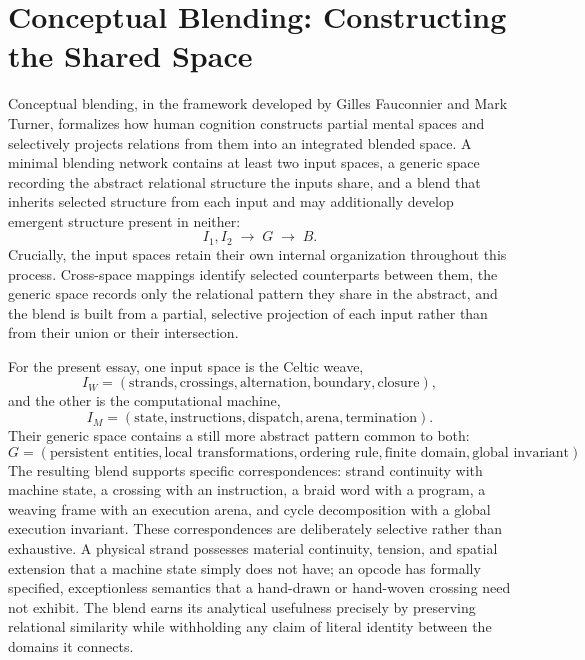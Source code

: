 \documentclass[11pt,openany]{book}
\begin{document}
\section{Conceptual Blending: Constructing the Shared Space}

Conceptual blending, in the framework developed by Gilles Fauconnier and Mark Turner, formalizes how human cognition constructs partial mental spaces and selectively projects relations from them into an integrated blended space. A minimal blending network contains at least two input spaces, a generic space recording the abstract relational structure the inputs share, and a blend that inherits selected structure from each input and may additionally develop emergent structure present in neither:
\[
I_1, I_2 \;\longrightarrow\; G \;\longrightarrow\; B.
\]
Crucially, the input spaces retain their own internal organization throughout this process. Cross-space mappings identify selected counterparts between them, the generic space records only the relational pattern they share in the abstract, and the blend is built from a partial, selective projection of each input rather than from their union or their intersection.

For the present essay, one input space is the Celtic weave,
\[
I_W = (\text{strands}, \text{crossings}, \text{alternation}, \text{boundary}, \text{closure}),
\]
and the other is the computational machine,
\[
I_M = (\text{state}, \text{instructions}, \text{dispatch}, \text{arena}, \text{termination}).
\]
Their generic space contains a still more abstract pattern common to both:
\[
G = (\text{persistent entities}, \text{local transformations}, \text{ordering rule}, \text{finite domain}, \text{global invariant}).
\]
The resulting blend supports specific correspondences: strand continuity with machine state, a crossing with an instruction, a braid word with a program, a weaving frame with an execution arena, and cycle decomposition with a global execution invariant. These correspondences are deliberately selective rather than exhaustive. A physical strand possesses material continuity, tension, and spatial extension that a machine state simply does not have; an opcode has formally specified, exceptionless semantics that a hand-drawn or hand-woven crossing need not exhibit. The blend earns its analytical usefulness precisely by preserving relational similarity while withholding any claim of literal identity between the domains it connects.
\end{document}
